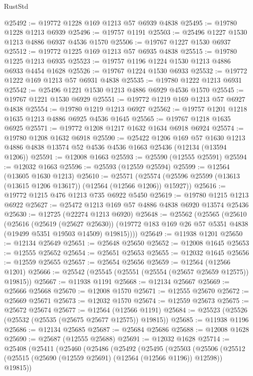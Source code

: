 \begin{lexlean}{RustStd}
\begin{coremodule}
@25492 := @19772 @1228 @169 @1213 @57 @6939 @4838
@25495 := @19780 @1228 @1213 @6939
@25496 := @19757 @1191
@25503 := @25496 @1227 @1530 @1213 @4886 @6937 @4536 @1570
@25506 := @19767 @1227 @1530 @6937
@25512 := @19772 @1225 @169 @1213 @57 @6935 @4838
@25515 := @19780 @1225 @1213 @6935
@25523 := @19757 @1196 @1224 @1530 @1213 @4886 @6933 @4454 @1628
@25526 := @19767 @1224 @1530 @6933
@25532 := @19772 @1222 @169 @1213 @57 @6931 @4838
@25535 := @19780 @1222 @1213 @6931
@25542 := @25496 @1221 @1530 @1213 @4886 @6929 @4536 @1570
@25545 := @19767 @1221 @1530 @6929
@25551 := @19772 @1219 @169 @1213 @57 @6927 @4838
@25554 := @19780 @1219 @1213 @6927
@25562 := @19757 @1201 @1218 @1635 @1213 @4886 @6925 @4536 @1645
@25565 := @19767 @1218 @1635 @6925
@25571 := @19772 @1208 @1217 @1632 @1634 @6918 @6924
@25574 := @19780 @1208 @1632 @6918
@25590 := @25422
    @1206
    @169
    @57
    @1630
    @1213
    @4886
    @4838
    @13574
    @52
    @4536
    @4536
    @1663
    @25436
    (@12134 (@13594 @1206))
@25591 := @12008 @1663
@25593 := @25590 (@12555 @25591)
@25594 := @12032 @1663
@25596 := @25593 (@12559 @25594)
@25599 := @12564 (@13605 @1630 @1213)
@25610 := @25571
    (@25574 (@25596 @25599 (@13613 (@13615 @1206 @13617)) (@12564 (@12566 @1206)) @15927))
@25616 := @19772 @1215 @476 @1213 @735 @6922 @5450
@25619 := @19780 @1215 @1213 @6922
@25627 := @25472 @1213 @169 @57 @4886 @4838 @6920 @13574 @25436
@25630 := @12725 (@22274 @1213 @6920)
@25648 := @25562
    (@25565
      (@25610
        (@25616
          (@25619 (@25627 @25630))
          (@19772 @183 @169 @26 @57 @5351 @4838 (@19499 @5351 @19503 @14509) @19815))))
@25649 := @11938 @1201
@25650 := @12134 @25649
@25651 := @25648 @25650
@25652 := @12008 @1645
@25653 := @12555 @25652
@25654 := @25651 @25653
@25655 := @12032 @1645
@25656 := @12559 @25655
@25657 := @25654 @25656
@25659 := @12564 (@12566 @1201)
@25666 := @25542 (@25545 (@25551 (@25554 (@25657 @25659 @12575)) @19815))
@25667 := @11938 @1191
@25668 := @12134 @25667
@25669 := @25666 @25668
@25670 := @12008 @1570
@25671 := @12555 @25670
@25672 := @25669 @25671
@25673 := @12032 @1570
@25674 := @12559 @25673
@25675 := @25672 @25674
@25677 := @12564 (@12566 @1191)
@25684 := @25523 (@25526 (@25532 (@25535 (@25675 @25677 @12575)) @19815))
@25685 := @11938 @1196
@25686 := @12134 @25685
@25687 := @25684 @25686
@25688 := @12008 @1628
@25690 := @25687 (@12555 @25688)
@25691 := @12032 @1628
@25714 := @25408
    (@25411
      (@25460
        (@25486
          (@25492
            (@25495
              (@25503
                (@25506
                  (@25512 (@25515 (@25690 (@12559 @25691) (@12564 (@12566 @1196)) @12598)) @19815))

\end{coremodule}
\end{lexlean}
